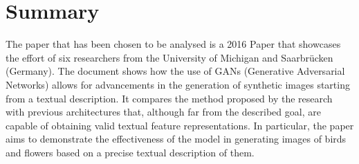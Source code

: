 \section*{Summary}

The paper that has been chosen to be analysed is a 2016 Paper  
that showcases the effort of six researchers from the University of 
Michigan and Saarbrücken (Germany). 
The document shows how the use of GANs (Generative Adversarial Networks) 
allows for advancements in the generation of synthetic images starting 
from a textual description. 
It compares the method proposed by the research with previous architectures
that, although far from the described goal, are capable of obtaining 
valid textual feature representations. 
In particular, the paper aims to demonstrate the effectiveness of 
the model in generating images of birds and flowers based on a precise 
textual description of them.